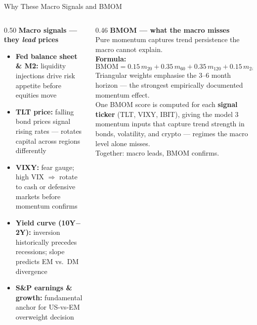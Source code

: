 \documentclass[aspectratio=169,11pt]{beamer}
\begin{document}

\begin{frame}{Why These Macro Signals and BMOM}
  \begin{columns}[T]
    \begin{column}{0.50\textwidth}
      \textbf{Macro signals --- they \emph{lead} prices}\\[0.4em]
      \begin{itemize}\small
        \setlength\itemsep{0.35em}
        \item \textbf{Fed balance sheet \& M2:} liquidity injections drive risk appetite before equities move
        \item \textbf{TLT price:} falling bond prices signal rising rates --- rotates capital across regions differently
        \item \textbf{VIXY:} fear gauge; high VIX $\Rightarrow$ rotate to cash or defensive markets before momentum confirms
        \item \textbf{Yield curve (10Y$-$2Y):} inversion historically precedes recessions; slope predicts EM vs.\ DM divergence
        \item \textbf{S\&P earnings \& growth:} fundamental anchor for US-vs-EM overweight decision
      \end{itemize}
    \end{column}
    \begin{column}{0.46\textwidth}
      \textbf{BMOM --- what the macro misses}\\[0.4em]
      \normalsize
      Pure momentum captures trend persistence the macro cannot explain.\\[0.5em]
      \small
      \textbf{Formula:}
      \[
        \text{BMOM} = 0.15\,m_{20} + 0.35\,m_{60} + 0.35\,m_{120} + 0.15\,m_{240}
      \]
      Triangular weights emphasise the 3--6 month horizon --- the strongest empirically documented momentum effect.\\[0.5em]
      One BMOM score is computed for each \textbf{signal ticker} (TLT, VIXY, IBIT), giving the model 3 momentum inputs that capture trend strength in bonds, volatility, and crypto --- regimes the macro level alone misses.\\[0.5em]
      Together: macro leads, BMOM confirms.
    \end{column}
  \end{columns}
\end{frame}
\end{document}
